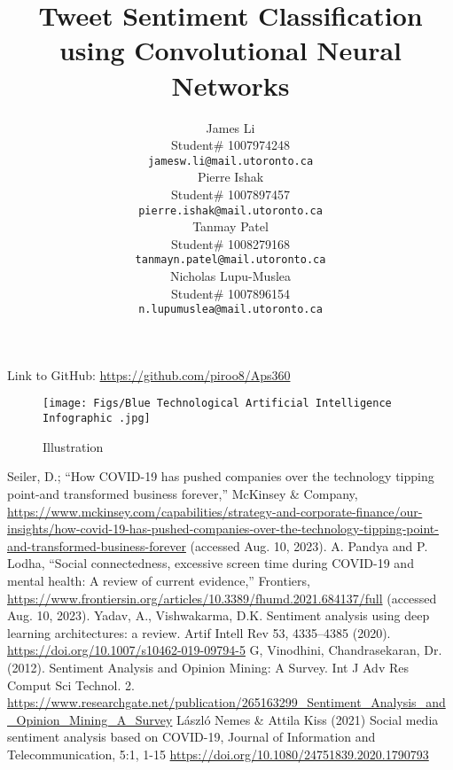 \documentclass{article} %
\title{Tweet Sentiment Classification using Convolutional Neural Networks\vspace{-0.75em}}
\author{James Li  \\
Student\# 1007974248\\
\texttt{jamesw.li@mail.utoronto.ca} \\
\And
Pierre Ishak \\
Student\# 1007897457 \\
\texttt{pierre.ishak@mail.utoronto.ca} \\
\AND
Tanmay Patel  \\
Student\# 1008279168 \\
\texttt{tanmayn.patel@mail.utoronto.ca} \\
\And
Nicholas Lupu-Muslea \\
Student\# 1007896154 \\
\texttt{n.lupumuslea@mail.utoronto.ca} \\
\AND
}
\begin{document}
\maketitle
\vspace{-4.5em}
Link to GitHub: \url{https://github.com/piroo8/Aps360}
\vspace{-1em}
%
\label{last_page}
\vspace{0.2em}
\hline
\begin{figure}[!ht]
    \centering
    \texttt{[image: Figs/Blue Technological Artificial Intelligence Infographic .jpg]}
    \caption{Illustration}
    \label{fig:illustration}
\end{figure}

\vfill\pagebreak
\appendix
\begin{thebibliography}{50}

 Seiler, D.; “How COVID-19 has pushed companies over the technology tipping point-and transformed business forever,” McKinsey \& Company, \url{https://www.mckinsey.com/capabilities/strategy-and-corporate-finance/our-insights/how-covid-19-has-pushed-companies-over-the-technology-tipping-point-and-transformed-business-forever} (accessed Aug. 10, 2023). 
 A. Pandya and P. Lodha, “Social connectedness, excessive screen time during COVID-19 and mental health: A review of current evidence,” Frontiers, \url{https://www.frontiersin.org/articles/10.3389/fhumd.2021.684137/full} (accessed Aug. 10, 2023).
 Yadav, A., Vishwakarma, D.K. Sentiment analysis using deep learning architectures: a review. Artif Intell Rev 53, 4335–4385 (2020). \url{https://doi.org/10.1007/s10462-019-09794-5}
 G, Vinodhini, Chandrasekaran, Dr. (2012). Sentiment Analysis and Opinion Mining: A Survey. Int J Adv Res Comput Sci Technol. 2. \url{https://www.researchgate.net/publication/265163299_Sentiment_Analysis_and_Opinion_Mining_A_Survey}
 László Nemes \& Attila Kiss (2021) Social media sentiment analysis based on COVID-19, Journal of Information and Telecommunication, 5:1, 1-15 \url{https://doi.org/10.1080/24751839.2020.1790793}

\end{thebibliography}
\end{document}
